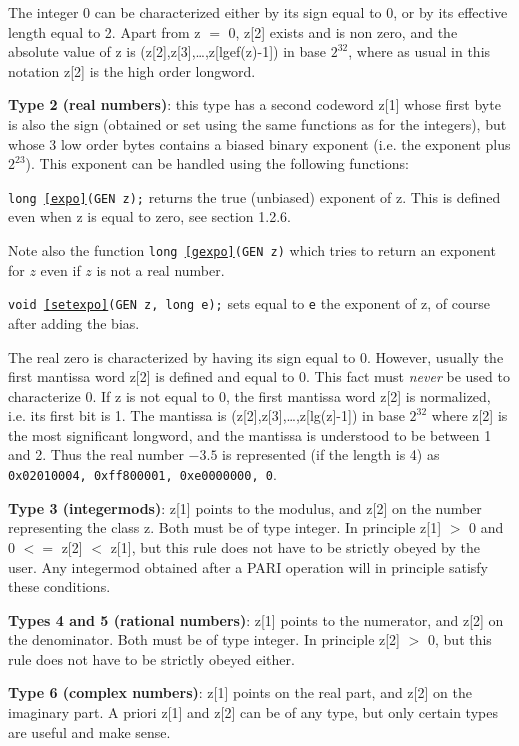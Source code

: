 The integer 0 can be characterized either by its sign equal to 0, or by
its effective length equal to 2. Apart from z $=$ 0, z[2] exists and is non zero,
and the absolute value of z is (z[2],z[3],\dots,z[lgef(z)-1]) in base $2^{32}$,
where as usual in this notation z[2] is the high order longword.

{\bf Type 2 (real numbers)}: 
this type has a second codeword z[1] whose first byte
is also the sign (obtained or set using the same functions as for the integers),
but whose 3 low order bytes contains a biased binary exponent (i.e. the exponent
plus $2^{23}$). This exponent can be handled using the following functions:

{\tt long \ref{expo}(GEN z);} returns the true (unbiased) exponent of z. This is
defined even when z is equal to zero, see section 1.2.6.

Note also the function {\tt long \ref{gexpo}(GEN z)} which tries to return an exponent
for $z$ even if $z$ is not a real number.

{\tt void \ref{setexpo}(GEN z, long e);} sets equal to {\tt e} the exponent of z, of course
after adding the bias.

The real zero is characterized by having its sign equal to 0. However, usually
the first mantissa word z[2] is defined and equal to 0. This fact must {\it never\/}
be used to characterize 0. If z is not equal to 0, the first mantissa word z[2]
is normalized, i.e. its first bit is 1. The mantissa is (z[2],z[3],\dots,z[lg(z]-1])
in base $2^{32}$ where z[2] is the most significant longword, and the mantissa
is understood to be between 1 and 2. Thus the real number $-3.5$ is represented
(if the length is 4) as {\tt 0x02010004, 0xff800001, 0xe0000000, 0}.

{\bf Type 3 (integermods)}: 
z[1] points to the modulus, and z[2] on the number
representing the class z. Both must be of type integer. In principle z[1] $>$
0 and 0 $<=$ z[2] $<$ z[1], but this rule does not have to be strictly obeyed
by the user. Any integermod obtained after a PARI operation will in principle
satisfy these conditions.

{\bf Types 4 and 5 (rational numbers)}: 
z[1] points to the numerator, and z[2] on the 
denominator. Both must be of type integer. In principle z[2] $>$ 0, but this
rule does not have to be strictly obeyed either.

{\bf Type 6 (complex numbers)}: 
z[1] points on the real part, and z[2] on the
imaginary part. A priori z[1] and z[2] can be of any type, but only certain types
are useful and make sense.

